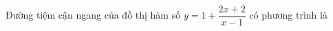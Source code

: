 \begin{ex}
Đường tiệm cận ngang của đồ thị hàm số $y=1+\dfrac{2x+2}{x-1}$ có phương trình là
\end{ex}

